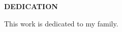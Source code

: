 \begin{center}
{\large \textbf{DEDICATION}} \\
\vspace{1in}
\end{center}
This work is dedicated to my family.
\hfill
\newpage